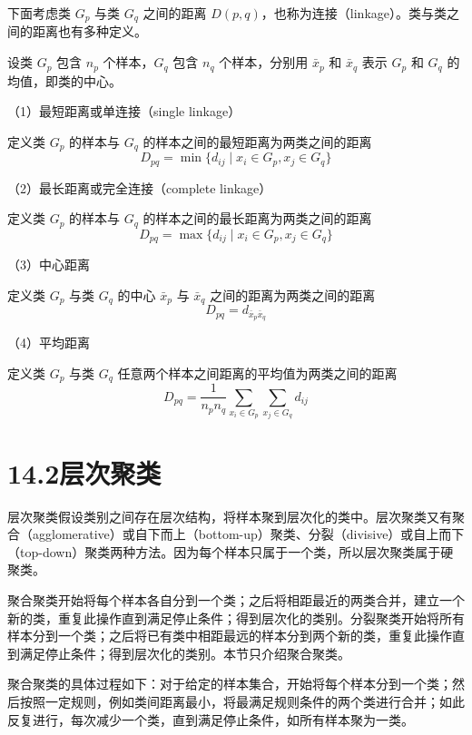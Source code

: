 \documentclass[UTF8,12pt,a4paper,fontset=fandol]{ctexart}
\begin{document}
下面考虑类 $G_p$ 与类 $G_q$ 之间的距离 $D(p,q)$，也称为连接（linkage）。类与类之间的距离也有多种定义。

设类 $G_p$ 包含 $n_p$ 个样本，$G_q$ 包含 $n_q$ 个样本，分别用 $\bar x_p$ 和 $\bar x_q$ 表示 $G_p$ 和 $G_q$ 的均值，即类的中心。

（1）最短距离或单连接（single linkage）

定义类 $G_p$ 的样本与 $G_q$ 的样本之间的最短距离为两类之间的距离
\begin{equation}
D_{pq}=\min\{d_{ij}\mid x_i\in G_p,x_j\in G_q\}
\tag{14.14}
\end{equation}

（2）最长距离或完全连接（complete linkage）

定义类 $G_p$ 的样本与 $G_q$ 的样本之间的最长距离为两类之间的距离
\begin{equation}
D_{pq}=\max\{d_{ij}\mid x_i\in G_p,x_j\in G_q\}
\tag{14.15}
\end{equation}

（3）中心距离

定义类 $G_p$ 与类 $G_q$ 的中心 $\bar x_p$ 与 $\bar x_q$ 之间的距离为两类之间的距离
\begin{equation}
D_{pq}=d_{\bar x_p\bar x_q}
\tag{14.16}
\end{equation}

（4）平均距离

定义类 $G_p$ 与类 $G_q$ 任意两个样本之间距离的平均值为两类之间的距离
\begin{equation}
D_{pq}=\frac{1}{n_pn_q}\sum_{x_i\in G_p}\sum_{x_j\in G_q}d_{ij}
\tag{14.17}
\end{equation}

\section*{14.2\quad 层次聚类}

层次聚类假设类别之间存在层次结构，将样本聚到层次化的类中。层次聚类又有聚合（agglomerative）或自下而上（bottom-up）聚类、分裂（divisive）或自上而下（top-down）聚类两种方法。因为每个样本只属于一个类，所以层次聚类属于硬聚类。

聚合聚类开始将每个样本各自分到一个类；之后将相距最近的两类合并，建立一个新的类，重复此操作直到满足停止条件；得到层次化的类别。分裂聚类开始将所有样本分到一个类；之后将已有类中相距最远的样本分到两个新的类，重复此操作直到满足停止条件；得到层次化的类别。本节只介绍聚合聚类。

聚合聚类的具体过程如下：对于给定的样本集合，开始将每个样本分到一个类；然后按照一定规则，例如类间距离最小，将最满足规则条件的两个类进行合并；如此反复进行，每次减少一个类，直到满足停止条件，如所有样本聚为一类。
\end{document}

